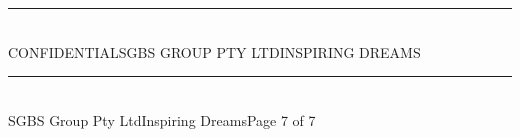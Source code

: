 \documentclass[a4paper,11pt]{article}
\newcommand{\pagefooter}[1]{%
  \vfill
  \noindent\textcolor{grayline}{\rule{\textwidth}{0.4pt}}\\[4pt]
  {\fontsize{7pt}{7pt}\selectfont\latolight\color{textlight}SGBS Group Pty Ltd\;\textbullet\;Inspiring Dreams\hfill Page #1 of 7}
}
\begin{document}
\vspace{40pt}
\begin{center}
\textcolor{grayline}{\rule{0.8\textwidth}{0.4pt}}\\[8pt]
{\color{textlight}\latolight\fontsize{7pt}{7pt}\selectfont{}CONFIDENTIAL\;\textbullet\;SGBS GROUP PTY LTD\;\textbullet\;INSPIRING DREAMS}
\end{center}

\pagefooter{7}
\end{document}
